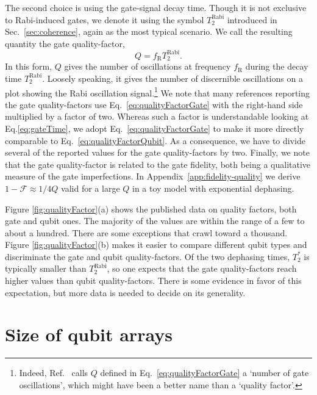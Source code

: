 \documentclass[aps, prx, showpacs, twocolumn, superscriptaddress, notitlepage, longbibliography, floatfix, nofootinbib]{revtex4-2}
\newcommand{\TRabi}{T_2^\mathrm{Rabi}}
\newcommand{\recheck}[1]{{#1}}
\begin{document}
The second choice is using the gate-signal decay time. Though it is not exclusive to Rabi-induced gates, we denote it using the symbol $ \TRabi$ introduced in Sec.~\ref{sec:coherence}, again as the most typical scenario. We call the resulting quantity the gate quality-factor,
\begin{equation}
Q = f_\mathrm{R}  \TRabi.
\label{eq:qualityFactorGate}
\end{equation}
In this form, $Q$ gives the number of oscillations at frequency $f_\mathrm{R}$ during the decay time $ \TRabi$. Loosely speaking, it gives the number of discernible oscillations on a plot showing the Rabi oscillation signal.\footnote{Indeed, Ref.~\cite{veldhorst_two-qubit_2015} calls $Q$ defined in Eq.~\eqref{eq:qualityFactorGate} a `number of gate oscillations', which might have been a better name than a `quality factor'.} We note that many references reporting the gate quality-factors use Eq.~\eqref{eq:qualityFactorGate} with the right-hand side multiplied by a factor of two. Whereas such a factor is understandable looking at Eq.\eqref{eq:gateTime}, we adopt Eq.~\eqref{eq:qualityFactorGate} to make it more directly comparable to Eq.~\ref{eq:qualityFactorQubit}. As a consequence, we have to divide several of the reported values for the gate quality-factors by two. Finally, we note that the gate quality-factor is related to the gate fidelity, both being a qualitative measure of the gate imperfections. In Appendix~\ref{app:fidelity-quality} we derive $1-\mathcal{F} \approx 1/4Q$ valid for a large $Q$ in a toy model with exponential dephasing.


Figure \ref{fig:qualityFactor}(a) shows the published data on quality factors, both gate and qubit ones. \recheck{The majority of the values are within the range of a few to about a hundred. There are some exceptions that crawl toward a thousand.} Figure \ref{fig:qualityFactor}(b) makes it easier to compare different qubit types and discriminate the gate and qubit quality-factors. 
Of the two dephasing times, $T_2^*$ is typically smaller than $ \TRabi$, \recheck{so one expects that the gate quality-factors reach higher values than qubit quality-factors.
There is some evidence in favor of this expectation, but more data is needed to decide on its generality.}


\section{Size of qubit arrays}
\end{document}

